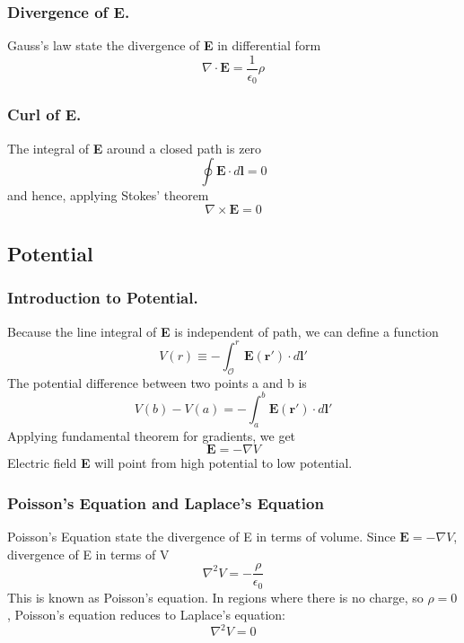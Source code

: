 \documentclass[../../../main.tex]{subfiles}
\begin{document}
\subsubsection*{Divergence of E.} Gauss's law state the divergence of \textbf{E} in differential form
\begin{equation*}
    \nabla \cdot \mathbf{E}=\frac{1}{\epsilon_0}\rho
\end{equation*}

\subsubsection*{Curl of E.} The integral of \textbf{E} around a closed path is zero 
\begin{equation*}
    \oint \mathbf{E} \cdot d\mathbf{l}  =0
\end{equation*}
and hence, applying Stokes' theorem
\begin{equation*}
    \nabla \times \mathbf{E}  =0
\end{equation*}


\subsection*{Potential}
\subsubsection*{Introduction to Potential.} Because the line integral of \textbf{E} is independent of path, we can define a function
\begin{equation*}
    V(r)\equiv -\int_{\mathcal{O}}^{r} \mathbf{E}(\mathbf{r'})\cdot d\mathbf{l'}
\end{equation*}
The potential difference between two points a and b is
\begin{equation*}
    V (b) - V (a)= -\int_{a}^{b} \mathbf{E}(\mathbf{r'})\cdot d\mathbf{l'}
\end{equation*}
Applying fundamental theorem for gradients, we get
\begin{equation*}
    \mathbf{E} =-\nabla V
\end{equation*}
Electric field \textbf{E} will point from high potential to low potential.

\subsubsection*{Poisson's Equation and Laplace's Equation}
Poisson's Equation state the divergence of E in terms of volume. 
Since $   \mathbf{E} =-\nabla V$, divergence of E in terms of V
\begin{equation*}
    \nabla^2 V=-\frac{\rho}{\epsilon_0}
\end{equation*}
This is known as Poisson's equation. In regions where there is no charge, so
$\rho = 0$, Poisson's equation reduces to Laplace's equation:
\begin{equation*}
    \nabla^2 V=0
\end{equation*}
\end{document}
